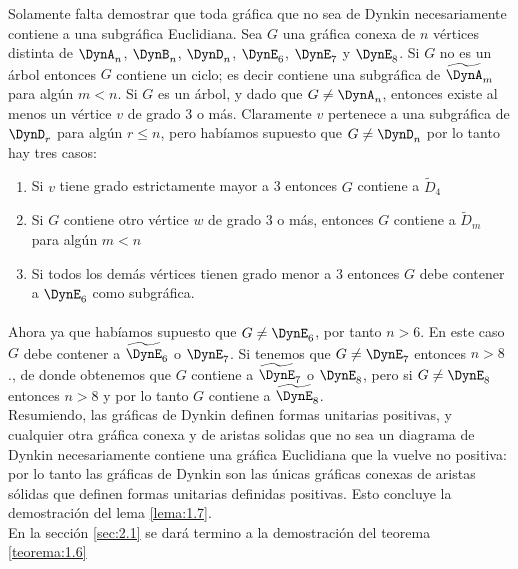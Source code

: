 Solamente falta demostrar que toda gráfica que no sea de Dynkin necesariamente contiene a una subgráfica Euclidiana. Sea $G$ una gráfica conexa de $n$ vértices distinta de $\DynA_{n}$, $\DynB_{n}$, $\DynD_{n}$, $\DynE_{6}$, $\DynE_{7}$ y $\DynE_{8}$. Si $G$ no es un árbol entonces $G$ contiene un ciclo; es decir contiene una subgráfica de $\widetilde{\DynA}_{m}$ para algún $m < n$. Si $G$ es un árbol, y dado que $G \neq \DynA_{n}$, entonces existe al menos un vértice $v$ de grado 3 o más. Claramente $v$ pertenece a una subgráfica de $\DynD_{r}$ para algún $r \leq n$, pero habíamos supuesto que $G \neq \DynD_{n}$ por lo tanto hay tres casos:

\begin{enumerate}
    \item Si $v$ tiene grado estrictamente mayor a 3 entonces $G$ contiene a $\widetilde{D}_{4}$
    \item Si $G$ contiene otro vértice $w$ de grado 3 o más, entonces $G$ contiene a $\widetilde{D}_{m}$ para algún $m < n$
    \item Si todos los demás vértices tienen grado menor a 3 entonces $G$ debe contener a $\DynE_{6}$ como subgráfica.
\end{enumerate}

\paragraph{}
 Ahora ya que habíamos supuesto que $G \neq \DynE_{6}$, por tanto $n > 6$. En este caso $G$ debe contener a $\widetilde{\DynE}_{6}$ o $\DynE_{7}$. Si tenemos que $G \neq \DynE_{7}$ entonces $n > 8$., de donde obtenemos que $G$ contiene a $\widetilde{\DynE}_{7}$ o $\DynE_{8}$, pero si $G \neq \DynE_{8}$ entonces $n > 8$ y por lo tanto $G$ contiene a $\widetilde{\DynE}_{8}$.\\
Resumiendo, las gráficas de Dynkin definen formas unitarias positivas, y cualquier otra gráfica conexa y de aristas solidas que no sea un diagrama de Dynkin necesariamente contiene una gráfica Euclidiana que la vuelve no positiva: por lo tanto las gráficas de Dynkin son las únicas gráficas conexas de aristas sólidas que definen formas unitarias definidas positivas. Esto concluye la demostración del lema \ref{lema:1.7}.\\
En la sección \ref{sec:2.1} se dará termino a la demostración del teorema \ref{teorema:1.6}
